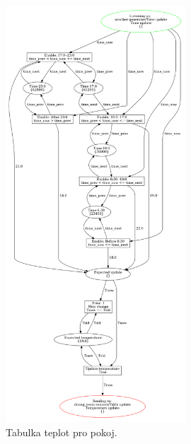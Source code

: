 \begin{figure}[htb]
 \centering
 \includegraphics[width=0.6\textwidth]{obrazky-figures/room-timetable.png}
 \caption{Tabulka teplot pro pokoj.}
 \label{room-table-viz}
\end{figure}

